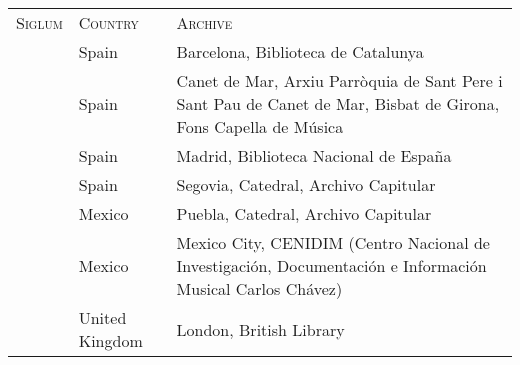 \begin{tabu} to \textwidth{llZ}
    \textsc{Siglum} & \textsc{Country} & \textsc{Archive}\\
    & Spain 
    & Barcelona, Biblioteca de Catalunya
    \\

    & Spain 
    & Canet de Mar, Arxiu Parròquia de Sant Pere i Sant Pau de Canet de 
    Mar, Bisbat de Girona, Fons Capella de Música
    \\

    & Spain 
    & Madrid, Biblioteca Nacional de España
    \\

    & Spain 
    & Segovia, Catedral, Archivo Capitular
    \\

    & Mexico 
    & Puebla, Catedral, Archivo Capitular
    \\
   
    & Mexico 
    & Mexico City, CENIDIM 
    \foreignlanguage{spanish}{(Centro Nacional de Investigación, Documentación e
    Información Musical Carlos Chávez)}
    \\

    & United Kingdom 
    & London, British Library
    \\
\end{tabu}





